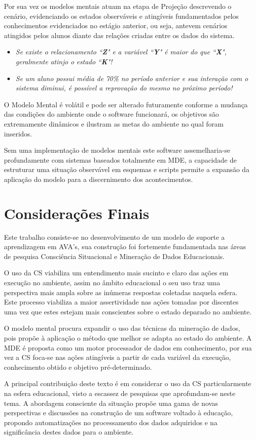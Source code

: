 \documentclass[12pt]{article}
\begin{document}
Por sua vez os modelos mentais atuam na etapa de Projeção descrevendo o cenário, evidenciando os estados observáveis e atingíveis fundamentados pelos conhecimentos evidenciados no estágio anterior, ou seja, antevem cenários atingidos pelos alunos diante das relações criadas entre os dados do sistema.

\begin{itemize}	
	\item \textit{Se existe o relacionamento ``\textbf{Z}" e a variável ``\textbf{Y}" é maior do que ``\textbf{X}", geralmente atinjo o estado ``\textbf{K}"!}
	\item \textit{Se um aluno possui média de 70\% no período anterior e sua interação com o sistema diminui, é possível a reprovação do mesmo no próximo período!}
\end{itemize}

O Modelo Mental é volátil e pode ser alterado futuramente conforme a mudança das condições do ambiente onde o software funcionará, os objetivos são extremamente dinâmicos e ilustram as metas do ambiente no qual foram inseridos.

Sem uma implementação de modelos mentais este software assemelharia-se profundamente com sistemas baseados totalmente em MDE, a capacidade de estruturar uma situação observável em esquemas e scripts permite a expansão da aplicação do modelo para a discernimento dos acontecimentos.

\section{Considerações Finais}

Este trabalho consiste-se no desenvolvimento de um modelo de suporte a aprendizagem em AVA’s, sua construção foi fortemente fundamentada nas áreas de pesquisa Consciência Situacional e Mineração de Dados Educacionais.

O uso da CS viabiliza um entendimento mais sucinto e claro das ações em execução no ambiente, assim no âmbito educacional o seu uso traz uma perspectiva mais ampla sobre as inúmeras respostas coletadas naquela esfera. Este processo viabiliza a maior assertividade nas ações tomadas por discentes uma vez que estes estejam mais conscientes sobre o estado deparado no ambiente.

O modelo mental procura expandir o uso das técnicas da mineração de dados, pois propõe à aplicação o método que melhor se adapta ao estado do ambiente. A MDE é proposta como um motor processador de dados em conhecimento, por sua vez a CS foca-se nas ações atingíveis a partir de cada variável da execução, conhecimento obtido e objetivo pré-determinado.

A principal contribuição deste texto é em considerar o uso da CS particularmente na esfera educacional, visto a escassez de pesquisas que aprofundam-se neste tema. A abordagem consciente da situação propõe uma gama de novas perspectivas e discussões na construção de um software voltado à educação, propondo automatizações no processamento dos dados adquiridos e na significância destes dados para o ambiente.  



\end{document}
